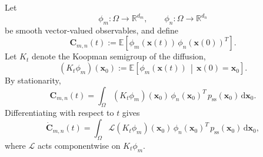 \documentclass[11pt,twoside,fleqn]{article}
\renewcommand{\d}{\mathrm{d}}
\begin{document}
Let
\begin{equation}
    \phi_m:\Omega\to\mathbb{R}^{d_m},
    \qquad
    \phi_n:\Omega\to\mathbb{R}^{d_n}
\end{equation}
be smooth vector-valued observables, and define
\begin{equation}
    \bm{C}_{m,n}(t)
    :=
    \mathbb{E}
    \left[
        \phi_m(\bm{x}(t))\,
        \phi_n(\bm{x}(0))^T
    \right].
    \label{eq:app_Cmn_definition}
\end{equation}
Let $K_t$ denote the Koopman semigroup of the diffusion,
\begin{equation}
    (K_t\phi_m)(\bm{x}_0)
    :=
    \mathbb{E}
    \left[
        \phi_m(\bm{x}(t))
        \,\middle|\,
        \bm{x}(0)=\bm{x}_0
    \right].
    \label{eq:app_Kt_definition}
\end{equation}
By stationarity,
\begin{equation}
    \bm{C}_{m,n}(t)
    =
    \int_\Omega
        (K_t\phi_m)(\bm{x}_0)\,
        \phi_n(\bm{x}_0)^T\,
        p_{\mathrm{ss}}(\bm{x}_0)\,
        \d\bm{x}_0 .
    \label{eq:app_Cmn_semigroup_form}
\end{equation}
Differentiating with respect to $t$ gives
\begin{equation}
    \dot{\bm{C}}_{m,n}(t)
    =
    \int_\Omega
        \mathcal{L}(K_t\phi_m)(\bm{x}_0)\,
        \phi_n(\bm{x}_0)^T\,
        p_{\mathrm{ss}}(\bm{x}_0)\,
        \d\bm{x}_0 ,
    \label{eq:app_Cmn_derivative_generator}
\end{equation}
where $\mathcal{L}$ acts componentwise on $K_t\phi_m$.
\end{document}
